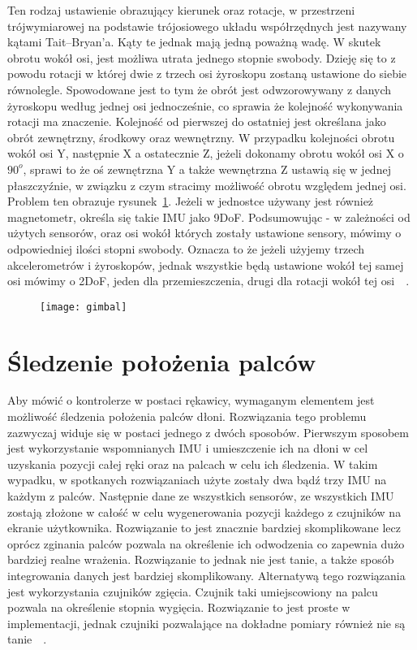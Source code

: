 Ten rodzaj ustawienie obrazujący kierunek oraz rotacje, w przestrzeni trójwymiarowej na podstawie trójosiowego układu współrzędnych jest nazywany kątami Tait–Bryan'a. Kąty te jednak mają jedną poważną wadę. W skutek obrotu wokół osi, jest możliwa utrata jednego stopnie swobody. Dzieję się to z powodu rotacji w której dwie z trzech osi żyroskopu zostaną ustawione do siebie równolegle. Spowodowane jest to tym że obrót jest odwzorowywany z danych żyroskopu według jednej osi jednocześnie, co sprawia że kolejność wykonywania rotacji ma znaczenie. Kolejność od pierwszej do ostatniej jest określana jako obrót zewnętrzny, środkowy oraz wewnętrzny. W przypadku kolejności obrotu wokół osi Y, następnie X a ostatecznie Z, jeżeli dokonamy obrotu wokół osi X o $90^o$, sprawi to że oś zewnętrzna Y a także wewnętrzna Z ustawią się w jednej płaszczyźnie, w związku z czym stracimy możliwość obrotu względem jednej osi. Problem ten obrazuje rysunek~\ref{fig:gimbal}. Jeżeli w jednostce używany jest również magnetometr, określa się takie IMU jako 9DoF. Podsumowując - w zależności od użytych sensorów, oraz osi wokół których zostały ustawione sensory, mówimy o odpowiedniej ilości stopni swobody. Oznacza to że jeżeli użyjemy trzech akcelerometrów i żyroskopów, jednak wszystkie będą ustawione wokół tej samej osi mówimy o 2DoF, jeden dla przemieszczenia, drugi dla rotacji wokół tej osi~\cite{rotations}~\cite{botland-arduino}.	
\begin{figure}[h]
\centering
\texttt{[image: gimbal]}
\label{fig:gimbal}
\end{figure}	
		
\section{Śledzenie położenia palców}
\label{sec:palce}
 Aby mówić o kontrolerze w postaci rękawicy, wymaganym elementem jest możliwość śledzenia położenia palców dłoni. Rozwiązania tego problemu zazwyczaj widuje się w postaci jednego z dwóch sposobów. Pierwszym sposobem jest wykorzystanie wspomnianych IMU i umieszczenie ich na dłoni w cel uzyskania pozycji całej ręki oraz na palcach w celu ich śledzenia. W takim wypadku, w spotkanych rozwiązaniach użyte zostały dwa bądź trzy IMU na każdym z palców. Następnie dane ze wszystkich sensorów, ze wszystkich IMU zostają złożone w całość w celu wygenerowania pozycji każdego z czujników na ekranie użytkownika. Rozwiązanie to jest znacznie bardziej skomplikowane lecz oprócz zginania palców pozwala na określenie ich odwodzenia co zapewnia dużo bardziej realne wrażenia. Rozwiązanie to jednak nie jest tanie, a także sposób integrowania danych jest bardziej skomplikowany. Alternatywą tego rozwiązania jest wykorzystania czujników zgięcia. Czujnik taki umiejscowiony na palcu pozwala na określenie stopnia wygięcia. Rozwiązanie to jest proste w implementacji, jednak czujniki pozwalające na dokładne pomiary również nie są tanie~\cite{flex-sensor}~\cite{manus}.
			
